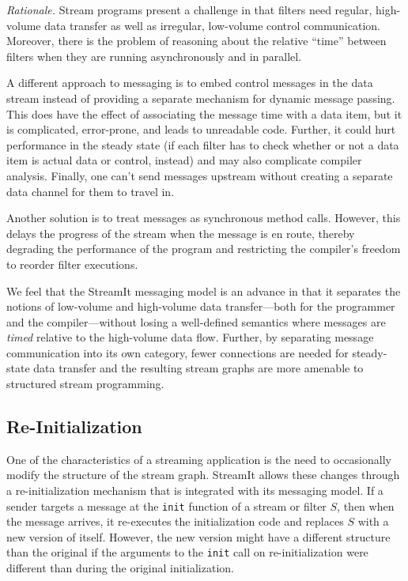 \emph{Rationale.}  Stream programs present a challenge in that filters
need  regular, high-volume data transfer as well as irregular, low-volume
control communication.  Moreover, there is the problem of reasoning
about the relative ``time'' between filters when they are running
asynchronously and in parallel.

A different approach to messaging  is to embed control messages in the
data  stream instead  of providing  a separate  mechanism  for dynamic
message passing.  This does have the effect of associating the message
time with a  data item, but it is  complicated, error-prone, and leads
to unreadable code.  Further, it  could hurt performance in the steady
state  (if each filter  has to  check whether  or not  a data  item is
actual  data or  control, instead)  and may  also  complicate compiler
analysis.  Finally, one can't  send messages upstream without creating
a separate data channel for them to travel in.

Another solution is to treat messages as synchronous method calls.
However, this delays the progress of the stream when the message is en
route, thereby degrading the performance of the program and
restricting the compiler's freedom to reorder filter executions.  

We feel that the StreamIt messaging model is an advance in that it
separates the notions of low-volume and high-volume data transfer---both
for the programmer and the compiler---without losing a well-defined
semantics where messages are \emph{timed} relative to the high-volume
data flow.  Further, by separating message communication into its own
category, fewer connections are needed for steady-state data transfer
and the resulting stream graphs are more amenable to structured stream
programming.

\subsection{Re-Initialization}
\label{sec:reinit}

One of the characteristics of a streaming application is the need to
occasionally modify the structure of  the stream graph.
StreamIt allows these changes through a re-initialization mechanism
that is integrated with its messaging model.  If a sender targets a
message at the \texttt{init} function of a stream or filter $S$, then
when the message arrives, it re-executes the initialization code and
replaces $S$ with a new version of itself.  However, the new version
might have a different structure than the original if the arguments to
the \texttt{init} call on re-initialization were different than during
the original initialization.

